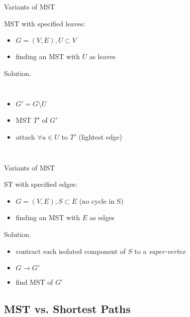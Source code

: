 \begin{frame}{Variants of MST}
  \begin{exampleblock}{MST with specified leaves: }
    \begin{itemize}
      \item $G = (V, E), U \subset V$
      \item finding an MST with $U$ as leaves
    \end{itemize}
  \end{exampleblock}

  \begin{block}{Solution.}
    \begin{columns}
	\begin{itemize}
	  \item $G' = G \setminus U$
	  \item MST $T'$ of $G'$
	  \item attach $\forall u \in U$ to $T'$ (lightest edge)
	\end{itemize}
    \end{columns}
  \end{block}
\end{frame}
\begin{frame}{Variants of MST}
  \begin{block}{ST with specified edges: }
    \begin{itemize}
      \item $G = (V,E), S \subset E$ (no cycle in S)
      \item finding an MST with $E$ as edges
    \end{itemize}
  \end{block}

  \begin{block}{Solution.}
    \begin{itemize}
      \item contract each isolated component of $S$ to a \emph{super-vertex}
      \item $G \to G'$
      \item find MST of $G'$
    \end{itemize}
  \end{block}
\end{frame}
\subsection{MST vs. Shortest Paths}

